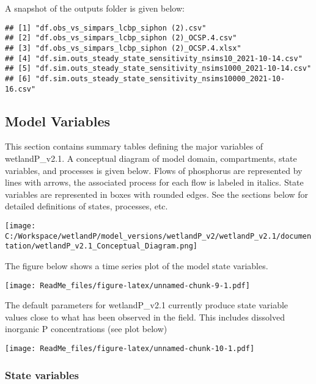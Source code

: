 \documentclass[
]{article}
\begin{document}
A snapshot of the outputs folder is given below:

\begin{verbatim}
## [1] "df.obs_vs_simpars_lcbp_siphon (2).csv"                         
## [2] "df.obs_vs_simpars_lcbp_siphon (2)_OCSP.4.csv"                  
## [3] "df.obs_vs_simpars_lcbp_siphon (2)_OCSP.4.xlsx"                 
## [4] "df.sim.outs_steady_state_sensitivity_nsims10_2021-10-14.csv"   
## [5] "df.sim.outs_steady_state_sensitivity_nsims1000_2021-10-14.csv" 
## [6] "df.sim.outs_steady_state_sensitivity_nsims10000_2021-10-16.csv"
\end{verbatim}

\hypertarget{model-variables}{%
\subsection{Model Variables}\label{model-variables}}

This section contains summary tables defining the major variables of
wetlandP\_v2.1. A conceptual diagram of model domain, compartments,
state variables, and processes is given below. Flows of phosphorus are
represented by lines with arrows, the associated process for each flow
is labeled in italics. State variables are represented in boxes with
rounded edges. See the sections below for detailed definitions of
states, processes, etc.

\texttt{[image: C:/Workspace/wetlandP/model\_versions/wetlandP\_v2/wetlandP\_v2.1/documentation/wetlandP\_v2.1\_Conceptual\_Diagram.png]}

The figure below shows a time series plot of the model state variables.

\texttt{[image: ReadMe\_files/figure-latex/unnamed-chunk-9-1.pdf]}

The default parameters for wetlandP\_v2.1 currently produce state
variable values close to what has been observed in the field. This
includes dissolved inorganic P concentrations (see plot below)

\texttt{[image: ReadMe\_files/figure-latex/unnamed-chunk-10-1.pdf]}

\hypertarget{state-variables}{%
\subsubsection{State variables}\label{state-variables}}
\end{document}
